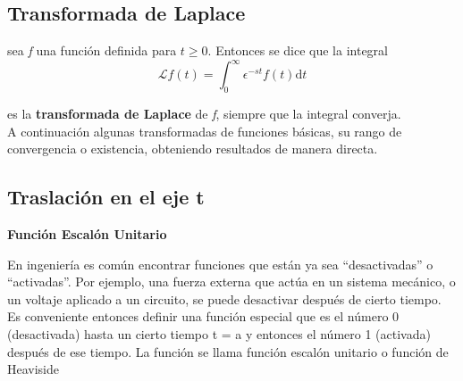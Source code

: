 \documentclass[12pt,a4paper]{article}
\begin{document}
\subsection{Transformada de Laplace}

sea \textit{f} una función definida para $ t \geq 0 $. Entonces se dice que la integral \\
\begin{equation}
\mathcal{L} {{f(t)}} =  \displaystyle\int_0^{\infty} \epsilon^{-st}f(t) \mathrm{d}t
\end{equation}

\vspace{0.2cm}
es la \textbf{transformada de Laplace} de \textit{f}, siempre que la integral converja.\\
A continuación algunas transformadas de funciones básicas, su rango de convergencia o existencia, obteniendo resultados de manera directa.

\vspace{0.2cm}
\begin{table}[h]
\centering
{}
\caption{Transformada de algunas funciones básicas}
\end{table}

\subsection{ Traslación en el eje t} \textbf{Función Escalón Unitario}

En ingeniería es común encontrar funciones que están ya sea “desactivadas” o “activadas”. Por ejemplo, una fuerza externa que actúa en un sistema mecánico, o un voltaje aplicado a un circuito, se puede desactivar después de cierto tiempo. Es conveniente entonces deﬁnir una función especial que es el número 0 (desactivada) hasta un cierto tiempo t = a y entonces el número 1 (activada) después de ese tiempo. La función se llama función escalón unitario o función de Heaviside
\\
\end{document}
